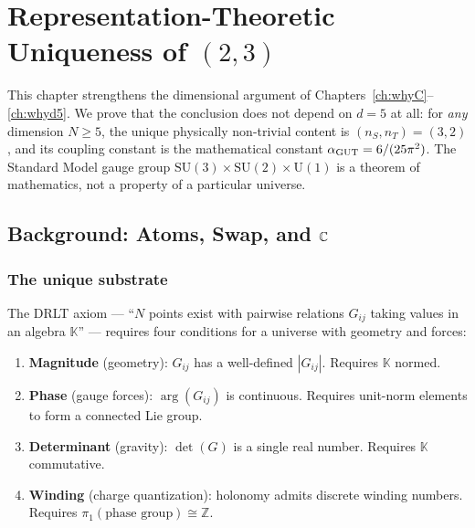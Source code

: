 \section{Representation-Theoretic Uniqueness of $(2,3)$}
\label{ch:rep_uniqueness}

This chapter strengthens the dimensional argument of Chapters~\ref{ch:whyC}--\ref{ch:whyd5}. We prove that the conclusion does not depend on $d = 5$ at all: for \emph{any} dimension $N \geq 5$, the unique physically non-trivial content is $(n_S, n_T) = (3, 2)$, and its coupling constant is the mathematical constant $\alpha_{\mathrm{GUT}} = 6/(25\pi^2)$. The Standard Model gauge group $\mathrm{SU}(3)\times\mathrm{SU}(2)\times\mathrm{U}(1)$ is a theorem of mathematics, not a property of a particular universe.

\subsection{Background: Atoms, Swap, and $\mathbb{C}$}

\subsubsection{The unique substrate}

The DRLT axiom --- ``$N$ points exist with pairwise relations $G_{ij}$ taking values in an algebra $\mathbb{K}$'' --- requires four conditions for a universe with geometry and forces:

\begin{enumerate}
\item[\textbf{R1.}] \textbf{Magnitude} (geometry): $G_{ij}$ has a well-defined $|G_{ij}|$. Requires $\mathbb{K}$ normed.
\item[\textbf{R2.}] \textbf{Phase} (gauge forces): $\arg(G_{ij})$ is continuous. Requires unit-norm elements to form a connected Lie group.
\item[\textbf{R3.}] \textbf{Determinant} (gravity): $\det(G)$ is a single real number. Requires $\mathbb{K}$ commutative.
\item[\textbf{R4.}] \textbf{Winding} (charge quantization): holonomy admits discrete winding numbers. Requires $\pi_1(\text{phase group}) \cong \mathbb{Z}$.
\end{enumerate}

